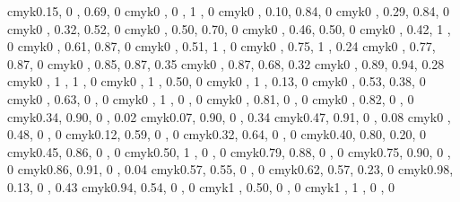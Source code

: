 \usepackage{color}
\definecolor{greenyellow}   {cmyk}{0.15, 0   , 0.69, 0   }
\definecolor{yellow}        {cmyk}{0   , 0   , 1   , 0   }
\definecolor{goldenrod}     {cmyk}{0   , 0.10, 0.84, 0   }
\definecolor{dandelion}     {cmyk}{0   , 0.29, 0.84, 0   }
\definecolor{apricot}       {cmyk}{0   , 0.32, 0.52, 0   }
\definecolor{peach}         {cmyk}{0   , 0.50, 0.70, 0   }
\definecolor{melon}         {cmyk}{0   , 0.46, 0.50, 0   }
\definecolor{yelloworange}  {cmyk}{0   , 0.42, 1   , 0   }
\definecolor{orange}        {cmyk}{0   , 0.61, 0.87, 0   }
\definecolor{burntorange}   {cmyk}{0   , 0.51, 1   , 0   }
\definecolor{bittersweet}   {cmyk}{0   , 0.75, 1   , 0.24}
\definecolor{redorange}     {cmyk}{0   , 0.77, 0.87, 0   }
\definecolor{mahogany}      {cmyk}{0   , 0.85, 0.87, 0.35}
\definecolor{maroon}        {cmyk}{0   , 0.87, 0.68, 0.32}
\definecolor{brickred}      {cmyk}{0   , 0.89, 0.94, 0.28}
\definecolor{red}           {cmyk}{0   , 1   , 1   , 0   }
\definecolor{orangered}     {cmyk}{0   , 1   , 0.50, 0   }
\definecolor{rubinered}     {cmyk}{0   , 1   , 0.13, 0   }
\definecolor{salmon}        {cmyk}{0   , 0.53, 0.38, 0   }
\definecolor{carnationpink} {cmyk}{0   , 0.63, 0   , 0   }
\definecolor{magenta}       {cmyk}{0   , 1   , 0   , 0   }
\definecolor{violetred}     {cmyk}{0   , 0.81, 0   , 0   }
\definecolor{rhodamine}     {cmyk}{0   , 0.82, 0   , 0   }
\definecolor{mulberry}      {cmyk}{0.34, 0.90, 0   , 0.02}
\definecolor{redviolet}     {cmyk}{0.07, 0.90, 0   , 0.34}
\definecolor{fuchsia}       {cmyk}{0.47, 0.91, 0   , 0.08}
\definecolor{lavender}      {cmyk}{0   , 0.48, 0   , 0   }
\definecolor{thistle}       {cmyk}{0.12, 0.59, 0   , 0   }
\definecolor{orchid}        {cmyk}{0.32, 0.64, 0   , 0   }
\definecolor{darkorchid}    {cmyk}{0.40, 0.80, 0.20, 0   }
\definecolor{purple}        {cmyk}{0.45, 0.86, 0   , 0   }
\definecolor{plum}          {cmyk}{0.50, 1   , 0   , 0   }
\definecolor{violet}        {cmyk}{0.79, 0.88, 0   , 0   }
\definecolor{royalpurple}   {cmyk}{0.75, 0.90, 0   , 0   }
\definecolor{blueviolet}    {cmyk}{0.86, 0.91, 0   , 0.04}
\definecolor{periwinkle}    {cmyk}{0.57, 0.55, 0   , 0   }
\definecolor{cadetblue}     {cmyk}{0.62, 0.57, 0.23, 0   }
\definecolor{midnightblue}  {cmyk}{0.98, 0.13, 0   , 0.43}
\definecolor{navyblue}      {cmyk}{0.94, 0.54, 0   , 0   }
\definecolor{royalblue}     {cmyk}{1   , 0.50, 0   , 0   }
\definecolor{blue}          {cmyk}{1   , 1   , 0   , 0   }

